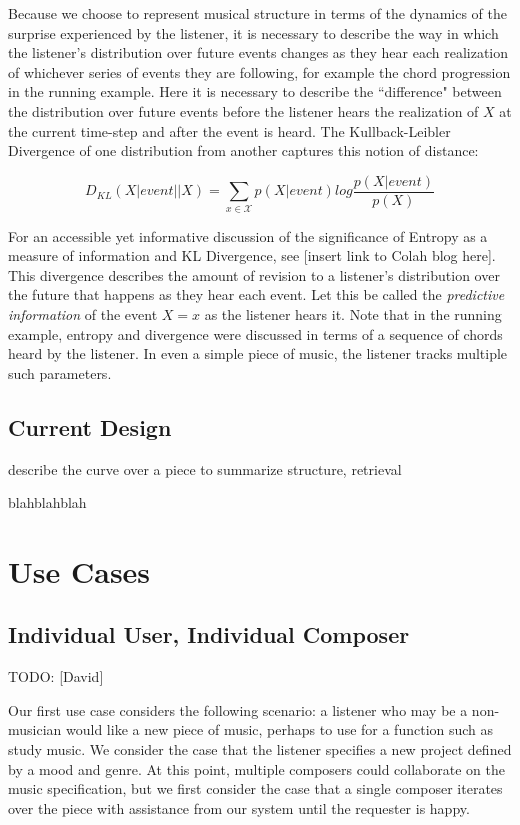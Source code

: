 \documentclass[final,authoryear,11pt,times]{elsarticle}
\begin{document}
Because we choose to represent musical structure in terms of the dynamics of the surprise experienced by the listener, it is necessary to describe the way in which the listener's distribution over future events changes as they hear each realization of whichever series of events they are following, for example the chord progression in the running example. Here it is necessary to describe the ``difference" between the distribution over future events before the listener hears the realization of $X$ at the current time-step and after the event is heard. The Kullback-Leibler Divergence of one distribution from another captures this notion of distance:

$$ D_{KL}(X | event || X) =  \sum_{x \in \mathcal{X}} p(X | event) log\frac{p(X | event) }{p(X)}$$

For an accessible yet informative discussion of the significance of Entropy as a measure of information and KL Divergence, see [insert link to Colah blog here]. This divergence describes the amount of revision to a listener's distribution over the future that happens as they hear each event. Let this be called the \textit{predictive information} of the event $X=x$ as the listener hears it. Note that in the running example, entropy and divergence were discussed in terms of a sequence of chords heard by the listener. In even a simple piece of music, the listener tracks multiple such parameters.

\subsection{Current Design}

describe the curve over a piece to summarize structure, retrieval

blahblahblah

\section{Use Cases}

\subsection{Individual User, Individual Composer}

TODO: [David]

Our first use case considers the following scenario: a listener who may be a non-musician would like a new piece of music, perhaps to use for a function such as study music. We consider the case that the listener specifies a new project defined by a mood and genre. At this point, multiple composers could collaborate on the music specification, but we first consider the case that a single composer iterates over the piece with assistance from our system until the requester is happy.
\end{document}
